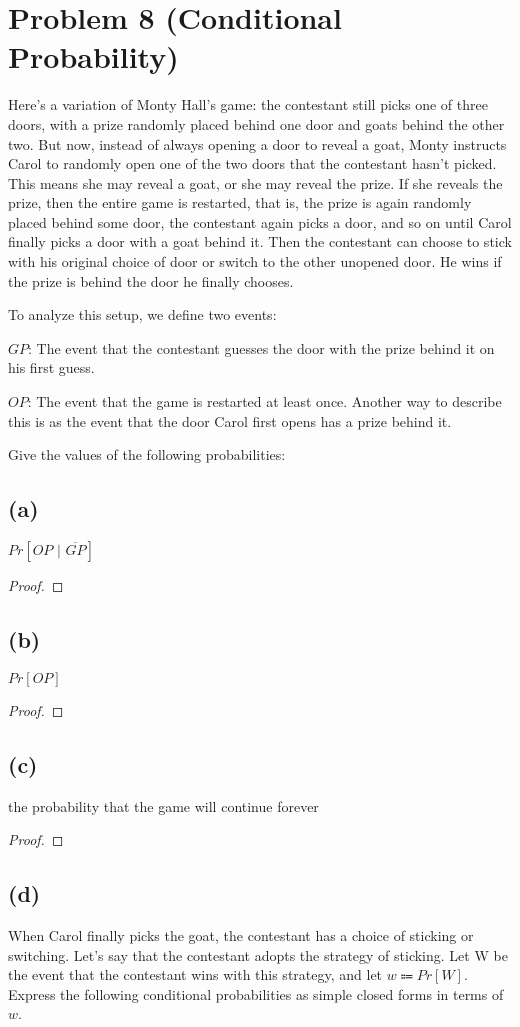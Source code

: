 \documentclass[14pt]{extarticle}
\begin{document}
\section{Problem 8 (Conditional Probability)}
Here’s a variation of Monty Hall’s game: the contestant still picks one of three doors, with a prize randomly placed behind one door and goats behind the other two. But now, instead of always opening a door to reveal a goat, Monty instructs Carol to randomly open one of the two doors that the contestant hasn’t picked. This means she may reveal a goat, or she may reveal the prize. If she reveals the prize, then the entire game is restarted, that is, the prize is again randomly placed behind some door, the contestant again picks a door, and so on until Carol finally picks a door with a goat behind it. Then the contestant can choose to stick with his original choice of door or switch to the other unopened door. He wins if the prize is behind the door he
finally chooses.

To analyze this setup, we define two events:

$GP$: The event that the contestant guesses the door with the prize behind it on his first guess.

$OP$: The event that the game is restarted at least once. Another way to describe this is as the event that the door Carol first opens has a prize behind it.

Give the values of the following probabilities:
\subsection{(a)}
$Pr[OP \,\,|\,\, \overline{GP}]$
\begin{proof}
\end{proof}

\subsection{(b)}
$Pr[OP]$
\begin{proof}
\end{proof}

\subsection{(c)}
the probability that the game will continue forever
\begin{proof}
\end{proof}

\subsection{(d)}
When Carol finally picks the goat, the contestant has a choice of sticking or switching. Let’s say that the contestant adopts the strategy of sticking. Let W be the event that the contestant wins with this strategy, and let $w \Coloneqq Pr[W]$. Express the following conditional probabilities as simple closed forms in terms of $w$.
\end{document}
